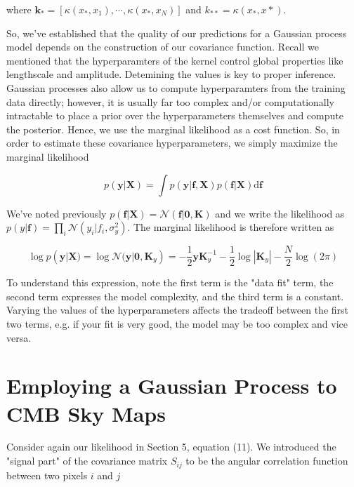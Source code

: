 \documentclass[12pt]{article}
\begin{document}
where $\textbf{k}_{*}=[\kappa(x_{*}, x_1),\cdots,\kappa(x_{*}, x_{N})]$ and $k_{**}=\kappa(x_{*},x{*})$.

So, we've established that the quality of our predictions for a Gaussian process model depends on the construction of our covariance function. Recall we mentioned that the hyperparamters of the kernel control global properties like lengthscale and amplitude. Detemining the values is key to proper inference. Gaussian processes also allow us to compute hyperparamters from the training data directly; however, it is usually far too complex and/or computationally intractable to place a prior over the hyperparameters themselves and compute the posterior. Hence, we use the marginal likelihood as a cost function. So, in order to estimate these covariance hyperparameters, we simply maximize the marginal likelihood 

\begin{equation}
p(\textbf{y}|\textbf{X})=\int p(\textbf{y}|\textbf{f},\textbf{X})p(\textbf{f}|\textbf{X})\mbox{d}\textbf{f}
\end{equation}

We've noted previously $p(\textbf{f}|\textbf{X})=\mathcal{N}(\textbf{f}|\textbf{0}, \textbf{K})$ and we write the likelihood as $p(y|\textbf{f})=\prod_i\mathcal{N}(y_i|f_i, \sigma^2_y)$. The marginal likelihood is therefore written as

\begin{equation}
\log p(\textbf{y}|\textbf{X})=\log\mathcal{N}(\textbf{y}|\textbf{0}, \textbf{K}_y)=-\frac{1}{2}\textbf{y}\textbf{K}^{-1}_y-\frac{1}{2}\log|\textbf{K}_y|-\frac{N}{2}\log(2\pi)
\end{equation}

To understand this expression, note the first term is the "data fit" term, the second term expresses the model complexity, and the third term is a constant. Varying the values of the hyperparameters affects the tradeoff between the first two terms, e.g. if your fit is very good, the model may be too complex and vice versa.







\section{Employing a Gaussian Process to CMB Sky Maps}

Consider again our likelihood in Section 5, equation (11). We introduced the "signal part" of the covariance matrix $S_{ij}$ to be the angular correlation function between two pixels $i$ and $j$
\end{document}
